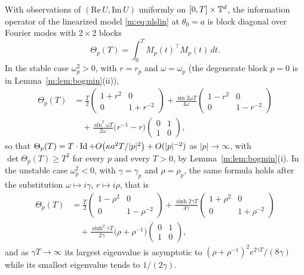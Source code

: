 \begin{proposition}\label{m:prop:bog}
With observations of $(\mathrm{Re}\,U,\mathrm{Im}\,U)$ uniformly on $[0,T]\times\mathbb{T}^d$, the information operator of the linearized model \eqref{m:eq:nlslin} at $\theta_0=a$ is block diagonal over Fourier modes with $2\times2$ blocks
\[
\Theta_p(T)=\int_0^TM_p(t)^\top M_p(t)\,dt .
\]
In the stable case $\omega_p^2>0$, with $r=r_p$ and $\omega=\omega_p$ (the degenerate block $p=0$ is in Lemma~\ref{m:lem:bogmin}(ii)),
\[
\begin{aligned}
\Theta_p(T)&=\frac T2\begin{pmatrix}1+r^2&0\\0&1+r^{-2}\end{pmatrix}+\frac{\sin2\omega T}{4\omega}\begin{pmatrix}1-r^2&0\\0&1-r^{-2}\end{pmatrix}\\
&\quad+\frac{\sin^2\omega T}{2\omega}\big(r^{-1}-r\big)\begin{pmatrix}0&1\\1&0\end{pmatrix},
\end{aligned}
\]
so that $\Theta_p(T)=T\cdot\operatorname{Id}+O\big(\kappa a^2T/|p|^2\big)+O(|p|^{-2})$ as $|p|\to\infty$, with $\det\Theta_p(T)\ge T^2$ for every $p$ and every $T>0$, by Lemma~\ref{m:lem:bogmin}(i). In the unstable case $\omega_p^2<0$, with $\gamma=\gamma_p$ and $\rho=\rho_p$, the same formula holds after the substitution $\omega\mapsto i\gamma$, $r\mapsto i\rho$, that is
\[
\begin{aligned}
\Theta_p(T)&=\frac T2\begin{pmatrix}1-\rho^2&0\\0&1-\rho^{-2}\end{pmatrix}+\frac{\sinh2\gamma T}{4\gamma}\begin{pmatrix}1+\rho^2&0\\0&1+\rho^{-2}\end{pmatrix}\\
&\quad+\frac{\sinh^2\gamma T}{2\gamma}\big(\rho+\rho^{-1}\big)\begin{pmatrix}0&1\\1&0\end{pmatrix},
\end{aligned}
\]
and as $\gamma T\to\infty$ its largest eigenvalue is asymptotic to $(\rho+\rho^{-1})^2e^{2\gamma T}/(8\gamma)$ while its smallest eigenvalue tends to $1/(2\gamma)$.
\end{proposition}

